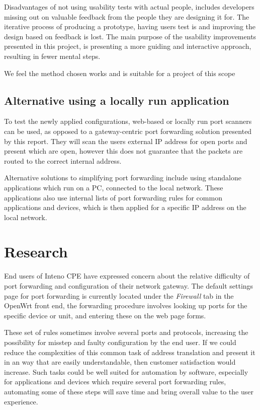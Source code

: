 \documentclass[a4paper,11pt,makeidx]{kth-bcs}
\begin{document}
Disadvantages of not using usability tests with actual people, includes developers missing out on valuable feedback from the people they are designing it for.
The iterative process of producing a prototype, having users test is and improving the design based on feedback is lost.
The main purpose of the usability improvements presented in this project, is presenting a more guiding and interactive approach, resulting in fewer mental steps.

We feel the method chosen works and is suitable for a project of this scope

\section{Alternative using a locally run application}
To test the newly applied configurations, web-based or locally run port scanners can be used, as opposed to a gateway-centric port forwarding solution presented by this report.
They will scan the users external IP address for open ports and present which are open, however this does not guarantee that the packets are routed to the correct internal address.

Alternative solutions to simplifying port forwarding include using standalone applications which run on a PC, connected to the local network.
These applications also use internal lists of port forwarding rules for common applications and devices, which is then applied for a specific IP address on the local network.\cite{portforward.com}

\chapter{Research}
End users of Inteno CPE have expressed concern about the relative difficulty of port forwarding and configuration of their network gateway.
The default settings page for port forwarding is currently located under the \emph{Firewall} tab in the OpenWrt front end, the forwarding procedure involves looking up ports for the specific device or unit, and entering these on the web page forms.

These set of rules sometimes involve several ports and protocols, increasing the possibility for misstep and faulty configuration by the end user.
If we could reduce the complexities of this common task of address translation and present it in an way that are easily understandable, then customer satisfaction would increase.
Such tasks could be well suited for automation by software, especially for applications and devices which require several port forwarding rules, automating some of these steps will save time and bring overall value to the user experience.
\end{document}
